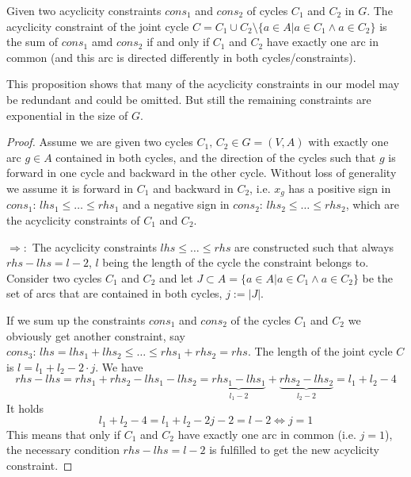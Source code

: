 \begin{prop}
\label{prop:redundantAcyclicityCons}
 Given two acyclicity constraints $cons_1$ and $cons_2$ of cycles $C_1$ and $C_2$ in $G$. The acyclicity constraint of 
the joint cycle $C=C_1\cup C_2 \setminus \{a\in A| a\in C_1\land a\in C_2 \}$ is the sum of $cons_1$ amd $cons_2$ if 
and only if $C_1$ and $C_2$ have exactly one arc in common (and this arc is directed differently in both 
cycles/constraints).%
\end{prop}
This proposition shows that many of the acyclicity constraints in our model may be redundant and could be omitted. 
But still the remaining constraints are exponential in the size of $G$.

\begin{proof}
 Assume we are given two cycles $C_1,\,C_2\in G=(V,A)$ with exactly one arc $g\in A$ 
contained in both cycles, and the direction of the cycles such that $g$ is forward in one cycle and backward in the 
other cycle. Without loss of generality we assume it is forward in $C_1$ and backward in $C_2$, i.e. $x_g$ has a 
positive sign in $cons_1:\,lhs_1\le \dots\le rhs_1$ and a negative sign in $cons_2:\, lhs_2\le \dots\le rhs_2$, which 
are the acyclicity constraints of $C_1$ and $C_2$. 

$\Rightarrow :$ 
The acyclicity constraints $lhs \le \dots\le rhs$ are constructed such that always $rhs-lhs=l-2$, $l$ being the length 
of the cycle the constraint belongs to. Consider two cycles $C_1$ and $C_2$ and let $J\subset A=\{a\in A|a\in C_1 
\land a\in C_2 \}$ be the set of arcs that are contained in both cycles, $j:=|J|$. 

If we sum up the constraints $cons_1$ and $cons_2$ of the cycles $C_1$ and $C_2$ we obviously get another constraint,
say $cons_3:\, lhs=lhs_1+lhs_2\le\dots\le rhs_1+rhs_2=rhs$. The length of the joint cycle $C$ is $l=l_1+l_2-2\cdot j$. 
We have 
$$rhs-lhs=rhs_1+rhs_2-lhs_1-lhs_2=\underbrace{rhs_1-lhs_1}_{l_1-2}+\underbrace{rhs_2-lhs_2}_{l_2-2}=l_1+l_2-4$$
It holds
$$l_1+l_2-4=l_1+l_2-2j-2=l-2 \iff j=1$$ 
This means that only if $C_1$ and $C_2$ have exactly one arc in common (i.e. $j=1$), the necessary condition 
$rhs-lhs=l-2$ is fulfilled to get the new acyclicity constraint.


\end{proof}
